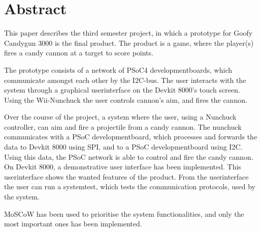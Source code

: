 \chapter{Abstract}
This paper describes the third semester project, in which a prototype for Goofy Candygun 3000 is the final product. The product is a game, where the player(s) fires a candy cannon at a target to score points.  \newline

\noindent The prototype consists of a network of PSoC4 developmentboards, which communicate amongst each other by the I2C-bus. The user interacts with the system through a graphical userinterface on the Devkit 8000's touch screen. Using the Wii-Nunchuck the user controls cannon's aim, and fires the cannon. \newline

\noindent Over the course of the project, a system where the user, using a Nunchuck controller, can aim and fire a projectile from a candy cannon. The nunchuck communicates with a PSoC developmentboard, which processes and forwards the data to Devkit 8000 using SPI, and to a PSoC developmentboard using I2C. Using this data, the PSoC network is able to control and fire the candy cannon. On Devkit 8000, a demonstrative user interface has been implemented. This userinterface shows the wanted features of the product. From the userinterface the user can run a systemtest, which tests the communication protocols, used by the system.

\noindent MoSCoW has been used to prioritise the system functionalities, and only the most important ones has been implemented.